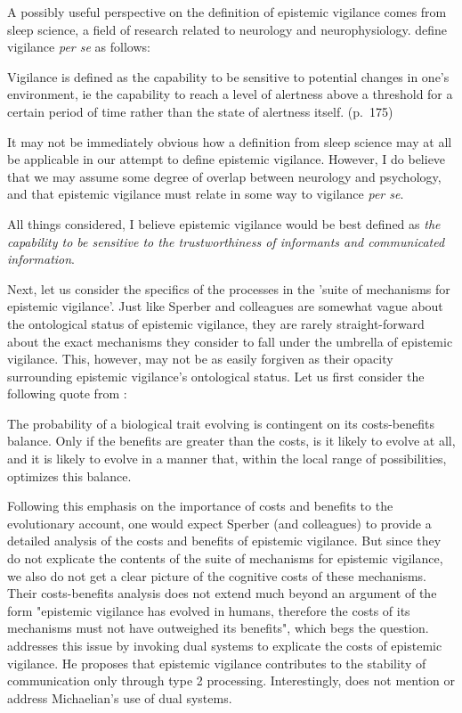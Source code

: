 A possibly useful perspective on the definition of epistemic vigilance comes from sleep science, a field of research related to neurology and neurophysiology. \citet{VanSchie21} define vigilance \emph{per se} as follows:
\begin{quoting}
    Vigilance is defined as the capability to be sensitive to potential changes in one's environment, ie the capability to reach a level of alertness above a threshold for a certain period of time rather than the state of alertness itself.
    \hfill (p.~175)
\end{quoting}
It may not be immediately obvious how a definition from sleep science may at all be applicable in our attempt to define epistemic vigilance. However, I do believe that we may assume some degree of overlap between neurology and psychology, and that epistemic vigilance must relate in some way to vigilance \emph{per se}.

All things considered, I believe epistemic vigilance would be best defined as \emph{the capability to be sensitive to the trustworthiness of informants and communicated information}.

Next, let us consider the specifics of the processes in the 'suite of mechanisms for epistemic vigilance'. Just like Sperber and colleagues are somewhat vague about the ontological status of epistemic vigilance, they are rarely straight-forward about the exact mechanisms they consider to fall under the umbrella of epistemic vigilance. This, however, may not be as easily forgiven as their opacity surrounding epistemic vigilance's ontological status. Let us first consider the following quote from \citet{Sperber13}:
\begin{quoting}
    The probability of a biological trait evolving is contingent on its costs-benefits balance. Only if the benefits are greater than the costs, is it likely to evolve at all, and it is likely to evolve in a manner that, within the local range of possibilities, optimizes this balance.
    \hfill \citep[p.~62]{Sperber13}
\end{quoting}
Following this emphasis on the importance of costs and benefits to the evolutionary account, one would expect Sperber (and colleagues) to provide a detailed analysis of the costs and benefits of epistemic vigilance.
But since they do not explicate the contents of the suite of mechanisms for epistemic vigilance, we also do not get a clear picture of the cognitive costs of these mechanisms.
Their costs-benefits analysis does not extend much beyond an argument of the form "epistemic vigilance has evolved in humans, therefore the costs of its mechanisms must not have outweighed its benefits", which begs the question.
\citet{Michaelian13} addresses this issue by invoking dual systems to explicate the costs of epistemic vigilance. He proposes that epistemic vigilance contributes to the stability of communication only through type 2 processing. Interestingly, \citet{Sperber13} does not mention or address Michaelian's use of dual systems.

